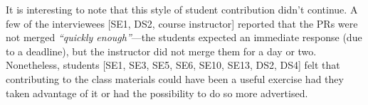 It is interesting to note that this style of student contribution didn't continue. A few of the interviewees [SE1, DS2, course instructor] reported that the PRs were not merged \textit{``quickly enough''}---the students expected an immediate response (due to a deadline), but the instructor did not merge them for a day or two. Nonetheless, students [SE1, SE3, SE5, SE6, SE10, SE13, DS2, DS4] felt that contributing to the class materials could have been a useful exercise had they taken advantage of it or had the possibility to do so more advertised.%




